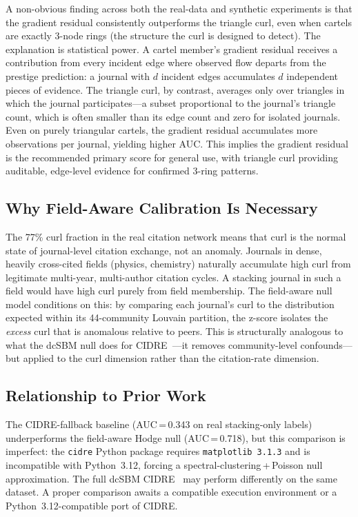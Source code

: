 \documentclass[twocolumn,11pt,letterpaper]{article}
\begin{document}
A non-obvious finding across both the real-data and synthetic experiments is
that the gradient residual consistently outperforms the triangle curl, even
when cartels are exactly 3-node rings (the structure the curl is designed to
detect). The explanation is statistical power. A cartel member's gradient
residual receives a contribution from every incident edge where observed flow
departs from the prestige prediction: a journal with $d$ incident edges
accumulates $d$ independent pieces of evidence. The triangle curl, by contrast,
averages only over triangles in which the journal participates---a subset
proportional to the journal's triangle count, which is often smaller than its
edge count and zero for isolated journals. Even on purely triangular cartels,
the gradient residual accumulates more observations per journal, yielding
higher AUC. This implies the gradient residual is the recommended primary score
for general use, with triangle curl providing auditable, edge-level evidence for
confirmed 3-ring patterns.

\subsection{Why Field-Aware Calibration Is Necessary}

The 77\% curl fraction in the real citation network means that curl is the
normal state of journal-level citation exchange, not an anomaly. Journals in
dense, heavily cross-cited fields (physics, chemistry) naturally accumulate
high curl from legitimate multi-year, multi-author citation cycles. A stacking
journal in such a field would have high curl purely from field membership. The
field-aware null model conditions on this: by comparing each journal's curl to
the distribution expected within its 44-community Louvain partition, the
z-score isolates the \emph{excess} curl that is anomalous relative to peers.
This is structurally analogous to what the dcSBM null does for
CIDRE~\cite{Kojaku2020}---it removes community-level confounds---but applied
to the curl dimension rather than the citation-rate dimension.

\subsection{Relationship to Prior Work}

The CIDRE-fallback baseline (AUC\,=\,0.343 on real stacking-only labels)
underperforms the field-aware Hodge null (AUC\,=\,0.718), but this comparison
is imperfect: the \texttt{cidre} Python package requires
\texttt{matplotlib~3.1.3} and is incompatible with Python~3.12, forcing a
spectral-clustering\,+\,Poisson null approximation. The full dcSBM
CIDRE~\cite{Kojaku2020} may perform differently on the same dataset. A proper
comparison awaits a compatible execution environment or a Python~3.12-compatible
port of CIDRE.
\end{document}
